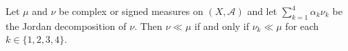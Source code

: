 Let $\mu$ and $\nu$ be complex or signed measures on $(X, \mathcal{A})$ and let $\sum_{k=1}^{4} \alpha_k \nu_k$ be the Jordan decomposition of $\nu$. Then $\nu \ll \mu$ if and only if $\nu_k \ll \mu$ for each $k \in \{1,2,3,4\}$.
